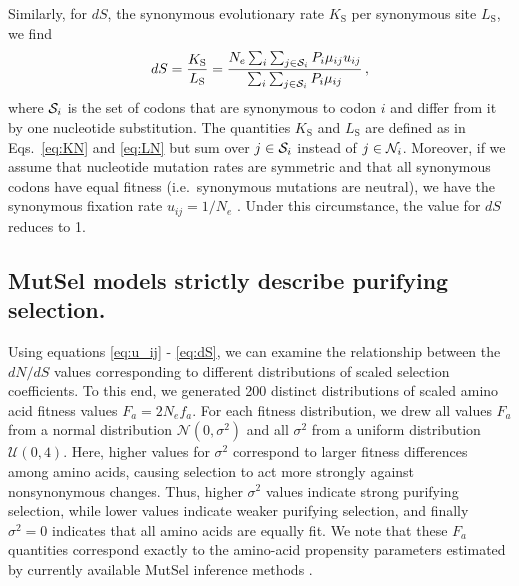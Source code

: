 \documentclass[11pt]{article}
\begin{document}
Similarly, for $dS$, the synonymous evolutionary rate $K_\text{S}$ per synonymous site $L_\text{S}$, we find
\begin{equation}\label{eq:dS}
	dS = \frac{K_\text{S}}{L_\text{S}}=\frac{ N_e \sum_i \sum_{j \in {\cal S}_i} P_i \mu_{ij} u_{ij} } {\sum_i \sum_{j \in {\cal S}_i} P_i \mu_{ij} }\,,
\end{equation}
where ${\cal S}_i$ is the set of codons that are synonymous to codon $i$ and differ from it by one nucleotide substitution. The quantities $K_\text{S}$ and $L_\text{S}$ are defined as in Eqs.~\eqref{eq:KN} and \eqref{eq:LN} but sum over $j\in {\cal S}_i$ instead of $j\in {\cal N}_i$. Moreover, if we assume that nucleotide mutation rates are symmetric and that all synonymous codons have equal fitness (i.e.\ synonymous mutations are neutral), we have the synonymous fixation rate $u_{ij}= 1/N_e$ \cite{CrowKimura1970}. Under this circumstance, the value for $dS$ reduces to 1.
		
				
\subsection*{MutSel models strictly describe purifying selection.}

Using equations \eqref{eq:u_ij} - \eqref{eq:dS}, we can examine the relationship between the $dN/dS$ values corresponding to different distributions of scaled selection coefficients. To this end, we generated 200 distinct distributions of scaled amino acid fitness values $F_a = 2N_ef_a$. For each fitness distribution, we drew all values $F_a$ from a normal distribution $\mathcal{N}(0,\sigma^2)$ and all $\sigma^2$ from a uniform distribution $\mathcal{U}(0,4)$. Here, higher values for $\sigma^2$ correspond to larger fitness differences among amino acids, causing selection to act more strongly against nonsynonymous changes. Thus, higher $\sigma^2$ values indicate strong purifying selection, while lower values indicate weaker purifying selection, and finally $\sigma^2 = 0$ indicates that all amino acids are equally fit. We note that these $F_a$ quantities correspond exactly to the amino-acid propensity parameters estimated by currently available MutSel inference methods \cite{RodrigueLartillot2014,Tamurietal2014}.
\end{document}
